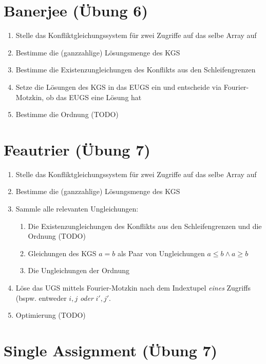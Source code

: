 \documentclass[a4paper,10pt]{article}
\begin{document}
\section{Banerjee (Übung 6)}

\begin{enumerate}
    \item Stelle das Konfliktgleichungssystem für zwei Zugriffe auf das selbe Array auf
    \item Bestimme die (ganzzahlige) Lösungsmenge des KGS
    \item Bestimme die Existenzungleichungen des Konflikts aus den Schleifengrenzen
    \item Setze die Lösungen des KGS in das EUGS ein und entscheide via Fourier-Motzkin, ob das EUGS eine Lösung hat
    \item Bestimme die Ordnung (TODO)
\end{enumerate}

\section{Feautrier (Übung 7)}

\begin{enumerate}
    \item Stelle das Konfliktgleichungssystem für zwei Zugriffe auf das selbe Array auf
    \item Bestimme die (ganzzahlige) Lösungsmenge des KGS
    \item Sammle alle relevanten Ungleichungen:\begin{enumerate}
        \item Die Existenzungleichungen des Konflikts aus den Schleifengrenzen und die Ordnung (TODO)
        \item Gleichungen des KGS $a=b$ als Paar von Ungleichungen $a\leq b\wedge a\geq b$
        \item Die Ungleichungen der Ordnung
    \end{enumerate}
    \item Löse das UGS mittels Fourier-Motzkin nach dem Indextupel \textit{eines} Zugriffs (bspw. entweder $i,j$ \textit{oder} $i',j'$.
    \item Optimierung (TODO)
\end{enumerate}

\section{Single Assignment (Übung 7)}
\end{document}
